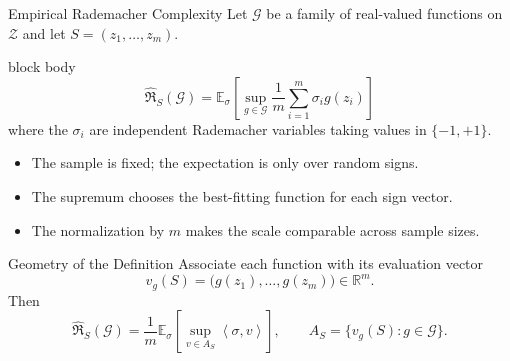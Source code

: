 \documentclass[aspectratio=169,10pt]{beamer}
\newcommand{\Z}{\mathcal{Z}}
\newcommand{\Gc}{\mathcal{G}}
\newcommand{\RadS}{\widehat{\mathfrak{R}}_S}
\newcommand{\pmone}{\{-1,+1\}}
\newcommand{\E}{\mathbb{E}}
\newcommand{\angles}[1]{\left\langle #1\right\rangle}
\begin{document}
\begin{frame}[t]{Empirical Rademacher Complexity}
  \vspace{0.06cm}
  Let $\Gc$ be a family of real-valued functions on $\Z$ and let
  $S=(z_1,\ldots,z_m)$.
  \vspace{0.06cm}
  \begin{beamercolorbox}[rounded=true,sep=0.23cm,wd=\linewidth]{block body}
    \[
      \boxed{
      \RadS(\Gc)
      =\E_{\sigma}\!\left[
        \sup_{g\in\Gc}\frac{1}{m}\sum_{i=1}^m \sigma_i g(z_i)
      \right]}
    \]
    where the $\sigma_i$ are independent Rademacher variables taking values in $\pmone$.
  \end{beamercolorbox}
  \vspace{0.14cm}
  \begin{itemize}
    \setlength{\itemsep}{0.10cm}
    \item The sample is fixed; the expectation is only over random signs.
    \item The supremum chooses the best-fitting function for each sign vector.
    \item The normalization by $m$ makes the scale comparable across sample sizes.
  \end{itemize}
\end{frame}

\begin{frame}[t]{Geometry of the Definition}
  \vspace{0.01cm}
  Associate each function with its evaluation vector
  \[
    v_g(S)=\bigl(g(z_1),\ldots,g(z_m)\bigr)\in\mathbb{R}^m.
  \]
  Then
  \[
    \RadS(\Gc)
    =\frac{1}{m}\E_{\sigma}\left[
      \sup_{v\in A_S}\angles{\sigma,v}
    \right],
    \qquad A_S=\{v_g(S):g\in\Gc\}.
  \]
  \begin{center}
  \end{center}
\end{frame}
\end{document}
